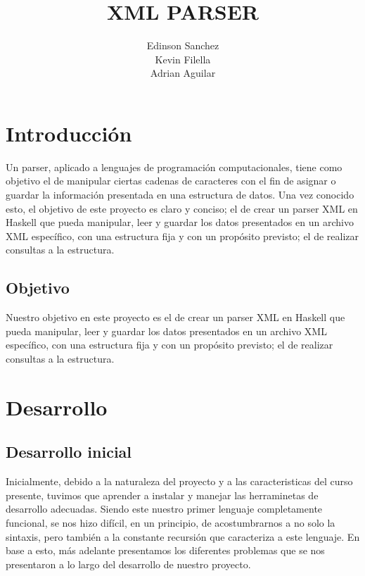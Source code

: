 \documentclass[11pt]{article} %
\title{XML PARSER}
\author{Edinson Sanchez\\Kevin Filella\\Adrian Aguilar}
\begin{document}
\maketitle



\newpage
\tableofcontents
\newpage

\section{Introducción}
Un parser, aplicado a lenguajes de programación computacionales, tiene como objetivo el de manipular ciertas cadenas de caracteres con el fin de asignar o guardar la información presentada en una estructura de datos.
Una vez conocido esto, el objetivo de este proyecto es claro y conciso; el de crear un parser XML en Haskell que pueda manipular, leer y guardar los datos presentados en un archivo XML específico, con una estructura fija y con un propósito previsto; el de realizar consultas a la estructura.


\subsection{Objetivo}
Nuestro objetivo en este proyecto es el de crear un parser XML en Haskell que pueda manipular, leer y guardar los datos presentados en un archivo XML específico, con una estructura fija y con un propósito previsto; el de realizar consultas a la estructura.

\section{Desarrollo}
\subsection{Desarrollo inicial}
Inicialmente, debido a la naturaleza del proyecto y a las caracteristicas del curso presente, tuvimos que aprender a instalar y manejar las herraminetas de desarrollo adecuadas. Siendo este nuestro primer lenguaje completamente funcional, se nos hizo difícil, en un principio, de acostumbrarnos a no solo la sintaxis, pero también a la constante recursión que caracteriza a este lenguaje.
En base a esto, más adelante presentamos los diferentes problemas que se nos presentaron a lo largo del desarrollo de nuestro proyecto.
\end{document}

